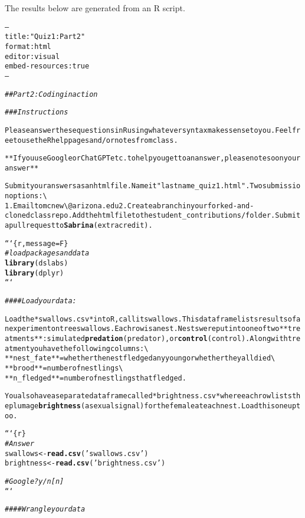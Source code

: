 \documentclass{article}\usepackage[]{graphicx}\usepackage[]{xcolor}
\makeatletter
\newcommand{\hlsng}[1]{\textcolor[rgb]{0.192,0.494,0.8}{#1}}%
\newcommand{\hlcom}[1]{\textcolor[rgb]{0.678,0.584,0.686}{\textit{#1}}}%
\newcommand{\hlkwd}[1]{\textcolor[rgb]{0.737,0.353,0.396}{\textbf{#1}}}%
\newenvironment{kframe}{%
 \def\at@end@of@kframe{}%
 \ifinner\ifhmode%
  \def\at@end@of@kframe{\end{minipage}}%
  \begin{minipage}{\columnwidth}%
 \fi\fi%
 \def\FrameCommand##1{\hskip\@totalleftmargin \hskip-\fboxsep
 \colorbox{shadecolor}{##1}\hskip-\fboxsep
     \hskip-\linewidth \hskip-\@totalleftmargin \hskip\columnwidth}%
 \MakeFramed {\advance\hsize-\width
   \@totalleftmargin\z@ \linewidth\hsize
   \@setminipage}}%
 {\par\unskip\endMakeFramed%
 \at@end@of@kframe}
\newenvironment{knitrout}{}{} %
\makeatother
\begin{document}
The results below are generated from an R script.

\begin{knitrout}
\color{fgcolor}\begin{kframe}
\begin{alltt}
---
  title: \hlsng{"Quiz 1: Part 2"}
format: html
editor: visual
embed-resources: true
---

\hlcom{  ## Part 2: Coding in action}

\hlcom{  ### Instructions}

  Please answer these questions in R using whatever syntax makes sense to you. Feel free to use the R help pages and/or notes from class.

**If you use Google or ChatGPT etc. to help you get to an answer, please note so on your answer**

  Submit your answers as an html file. Name it \hlsng{"lastname_quiz1.html"}. Two submission options:\textbackslash{}
1. Email to mcnew\textbackslash{}@arizona.edu 2. Create a branch in your forked-and-cloned class repo. Add the html file to the student_contributions/ folder. Submit a pull request to \hlkwd{Sabrina} (extra credit).

```\{r, message = F\}
\hlcom{# load packages and data}
\hlkwd{library}(dslabs)
\hlkwd{library}(dplyr)
```

\hlcom{#### Load your data:}

Load the *swallows.csv* into R, call it swallows. This data frame lists results of an experiment on tree swallows. Each row is a nest. Nests were put into one of two **treatments**: simulated \hlkwd{predation} (predator), or \hlkwd{control} (control). Along with treatment you have the following columns:\textbackslash{}
**nest_fate** = whether the nest fledged any young or whether they all died\textbackslash{}
**brood** = number of nestlings\textbackslash{}
**n_fledged** = number of nestlings that fledged.

You also have a separate data frame called *brightness.csv* where each row lists the plumage \hlkwd{brightness} (a sexual signal) for the female at each nest. Load this one up too.

```\{r\}
\hlcom{# Answer}
swallows <- \hlkwd{read.csv}(\hlsng{'swallows.csv'})
brightness <- \hlkwd{read.csv}(\hlsng{'brightness.csv'})

\hlcom{# Google? y/n [n]}
```

\hlcom{#### Wrangle your data}


\end{alltt}
\end{kframe}
\end{knitrout}
\end{document}
